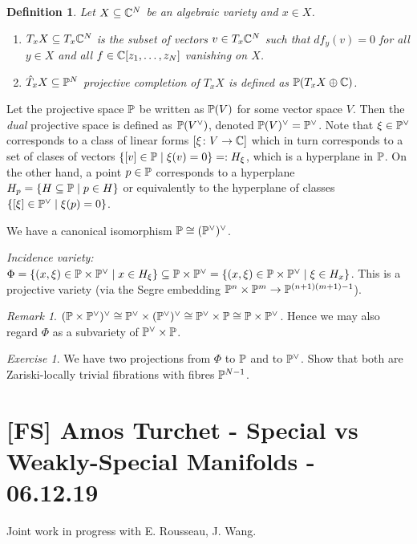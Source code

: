 \documentclass[A4paper, british, reqno]{amsart}
\theoremstyle{darkgreentheorem}
\theoremstyle{darkbluedefinition}
\newtheorem{defn}[thm]{Definition}
\theoremstyle{darkredexample}
\theoremstyle{remark}
\newtheorem{rem}[thm]{Remark}
\newtheorem{exe}[thm]{Exercise}
\newcommand{\1}{\mathbbm{1}}
\newcommand{\op}{\oplus}
\newcommand{\dual}{^{\vee}}
\newcommand{\tms}{\times}
\newcommand{\sub}{\subseteq}
\begin{document}
\begin{defn}
    Let $X\sub \C^{N}$ be an algebraic variety and $x\in X$.
    \begin{enumerate}
	\item $T_{x}X\sub T_{x}\C^{N}$ is the subset of vectors $v\in T_{x}\C^{N}$ such that $df_{y}(v)=0$ for all $y\in X$ and all $f\in \C[z_{1},\ldots,z_{N}]$ vanishing on $X$.
	\item $\hat{T}_{x}X\sub \P^{N}$ \textit{projective completion} of $T_{x}X$ is defined as $\P(T_{x}X\op \C)$.
    \end{enumerate}
\end{defn}

Let the projective space $\P$ be written as $\P(V)$ for some vector space $V$.
Then the \textit{dual} projective space is defined as $\P(V\dual)$, denoted $\P(V)\dual=\P\dual$.
Note that $\xi\in \P\dual$ corresponds to a class of linear forms $[\xi\colon V\to \C]$ which in turn corresponds to a set of clases of vectors $\{ [v]\in \P\mid \xi(v)=0\}=:H_{\xi}$, which is a hyperplane in $\P$.
On the other hand, a point $p\in \P$ corresponds to a hyperplane $H_{p}=\{ H\sub \P\mid p\in H\}$ or equivalently to the hyperplane of classes $\{[\xi]\in \P\dual \mid \xi(p)=0 \}$.

We have a canonical isomorphism $\P\cong (\P\dual)\dual$.

\textit{Incidence variety:} $\Phi=\{ (x,\xi)\in \P\tms \P\dual \mid x\in H_{\xi}\}\sub \P\tms \P\dual=\{(x,\xi)\in \P\tms \P\dual\mid \xi\in H_{x}\}$.
This is a projective variety (via the Segre embedding $\P^{n}\tms \P^{m}\to \P^{(n+1)(m+1)-1}$).

\begin{rem}
    $(\P\tms \P\dual)\dual\cong \P\dual \tms (\P\dual)\dual\cong \P\dual \tms \P\cong \P\tms \P\dual$.
    Hence we may also regard $\Phi $ as a subvariety of $\P\dual \tms \P$.
\end{rem}

\begin{exe}
    We have two projections from $\Phi$ to $\P$ and to $\P\dual$.
    Show that both are Zariski-locally trivial fibrations with fibres $\P^{N-1}$.
\end{exe}

\section{[FS] Amos Turchet - Special vs Weakly-Special Manifolds - 06.12.19}

Joint work in progress with E. Rousseau, J. Wang.
\end{document}
